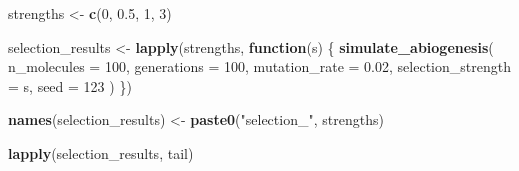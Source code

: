 \documentclass[
  oneside,
  openany]{book}
\newenvironment{Shaded}{\begin{snugshade}}{\end{snugshade}}
\newcommand{\AttributeTok}[1]{\textcolor[rgb]{0.13,0.29,0.53}{#1}}
\newcommand{\ControlFlowTok}[1]{\textcolor[rgb]{0.13,0.29,0.53}{\textbf{#1}}}
\newcommand{\DecValTok}[1]{\textcolor[rgb]{0.00,0.00,0.81}{#1}}
\newcommand{\FloatTok}[1]{\textcolor[rgb]{0.00,0.00,0.81}{#1}}
\newcommand{\FunctionTok}[1]{\textcolor[rgb]{0.13,0.29,0.53}{\textbf{#1}}}
\newcommand{\NormalTok}[1]{#1}
\newcommand{\OtherTok}[1]{\textcolor[rgb]{0.56,0.35,0.01}{#1}}
\newcommand{\StringTok}[1]{\textcolor[rgb]{0.31,0.60,0.02}{#1}}
\begin{document}
\begin{Shaded}
\begin{Highlighting}[]
\NormalTok{strengths }\OtherTok{\textless{}{-}} \FunctionTok{c}\NormalTok{(}\DecValTok{0}\NormalTok{, }\FloatTok{0.5}\NormalTok{, }\DecValTok{1}\NormalTok{, }\DecValTok{3}\NormalTok{)}

\NormalTok{selection\_results }\OtherTok{\textless{}{-}} \FunctionTok{lapply}\NormalTok{(strengths, }\ControlFlowTok{function}\NormalTok{(s) \{}
  \FunctionTok{simulate\_abiogenesis}\NormalTok{(}
    \AttributeTok{n\_molecules =} \DecValTok{100}\NormalTok{,}
    \AttributeTok{generations =} \DecValTok{100}\NormalTok{,}
    \AttributeTok{mutation\_rate =} \FloatTok{0.02}\NormalTok{,}
    \AttributeTok{selection\_strength =}\NormalTok{ s,}
    \AttributeTok{seed =} \DecValTok{123}
\NormalTok{  )}
\NormalTok{\})}

\FunctionTok{names}\NormalTok{(selection\_results) }\OtherTok{\textless{}{-}} \FunctionTok{paste0}\NormalTok{(}\StringTok{"selection\_"}\NormalTok{, strengths)}

\FunctionTok{lapply}\NormalTok{(selection\_results, tail)}
\end{Highlighting}
\end{Shaded}
\end{document}
